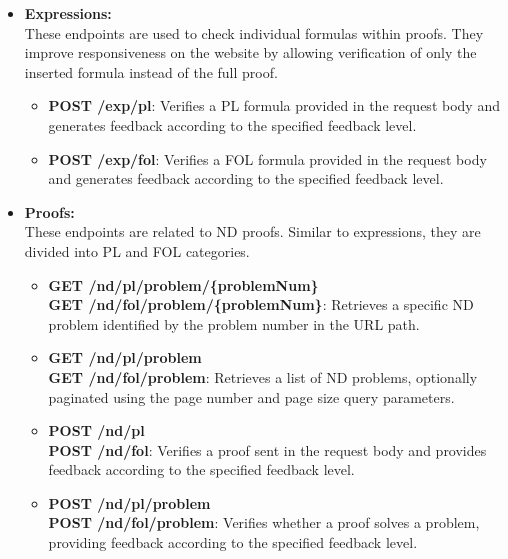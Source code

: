 \begin{itemize}[label={}]
\setlength{\itemsep}{5pt}
    \item \textbf{Expressions:}\\
    These endpoints are used to check individual formulas within proofs. They improve responsiveness on the website by allowing verification of only the inserted formula instead of the full proof.
    \begin{itemize}[noitemsep, topsep=0pt]
    \setlength{\itemsep}{5pt}
        \item \textbf{POST /exp/pl}: Verifies a \gls{PL} formula provided in the request body and generates feedback according to the specified feedback level.
        \item \textbf{POST /exp/fol}: Verifies a \gls{FOL} formula provided in the request body and generates feedback according to the specified feedback level.
    \end{itemize}

    \item \textbf{Proofs:}\\
    These endpoints are related to \gls{ND} proofs. Similar to expressions, they are divided into \gls{PL} and \gls{FOL} categories.
    \begin{itemize}[noitemsep, topsep=0pt]
\setlength{\itemsep}{5pt}
        \item \textbf{GET /nd/pl/problem/\{problemNum\}}\\
        \textbf{GET /nd/fol/problem/\{problemNum\}}: Retrieves a specific \gls{ND} problem identified by the problem number in the URL path.

        \item \textbf{GET /nd/pl/problem}\\
        \textbf{GET /nd/fol/problem}: Retrieves a list of \gls{ND} problems, optionally paginated using the page number and page size query parameters.

        \item \textbf{POST /nd/pl}\\
        \textbf{POST /nd/fol}: Verifies a proof sent in the request body and provides feedback according to the specified feedback level.

        \item \textbf{POST /nd/pl/problem}\\
        \textbf{POST /nd/fol/problem}: Verifies whether a proof solves a problem, providing feedback according to the specified feedback level.


\end{itemize}
\end{itemize}
